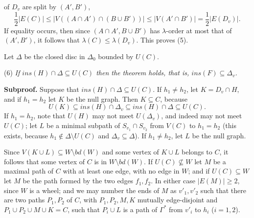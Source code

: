 \noindent of $D_v$ are split by $(A', B')$,
\begin{equation*}
\frac{1}{2}|E(C)| \le |V((A \cap A') \cap (B \cup B'))| \le |V(A' \cap B')| = \frac{1}{2}|E(D_v)|.
\end{equation*}
If equality occurs, then since $(A \cap A', B \cup B')$ has $\lambda$-order at most that of $(A', B')$, it follows that $\lambda(C) \le \lambda(D_v)$. This proves (5).

Let $\Delta$ be the closed disc in $\Delta_0$ bounded by $U(C)$.

\hspace*{12pt}(6) \textit{If $ins(H) \cap \Delta \subseteq U(C)$ then the theorem holds, that is, $ins(F) \subseteq \Delta_v$.}

\textbf{Subproof.} Suppose that $ins(H) \cap \Delta \subseteq U(C)$. If $h_1 \ne h_2$, let $K = D_v \cap H$, and if $h_1 = h_2$ let $K$ be the null graph. Then $K \subseteq C$, because
\begin{equation*}
U(K) \subseteq ins(H) \cap \Delta_v \subseteq ins(H) \cap \Delta \subseteq U(C).
\end{equation*}
If $h_1 = h_2$, note that $U(H)$ may not meet $U(\Delta_v)$, and indeed may not meet $U(C)$; let $L$ be a minimal subpath of $S_{v_1} \cap S_{v_2}$ from $V(C)$ to $h_1 = h_2$ (this exists, because $h_1 \notin \Delta \setminus U(C)$ and $\Delta_v \subseteq \Delta$). If $h_1 \ne h_2$, let $L$ be the null graph.

Since $V(K \cup L) \subseteq W \setminus bd(W)$ and some vertex of $K \cup L$ belongs to $C$, it follows that some vertex of $C$ is in $W \setminus bd(W)$. If $U(C) \nsubseteq W$ let $M$ be a maximal path of $C$ with at least one edge, with no edge in $W$; and if $U(C) \subseteq W$ let $M$ be the path formed by the two edges $f_1, f_2$. In either case $|E(M)| \ge 2$, since $W$ is a wheel; and we may number the ends of $M$ as $v'_1, v'_2$ such that there are two paths $P_1, P_2$ of $C$, with $P_1, P_2, M, K$ mutually edge-disjoint and $P_1 \cup P_2 \cup M \cup K = C$, such that $P_i \cup L$ is a path of $\Gamma^*$ from $v'_i$ to $h_i$ ($i = 1, 2$).

